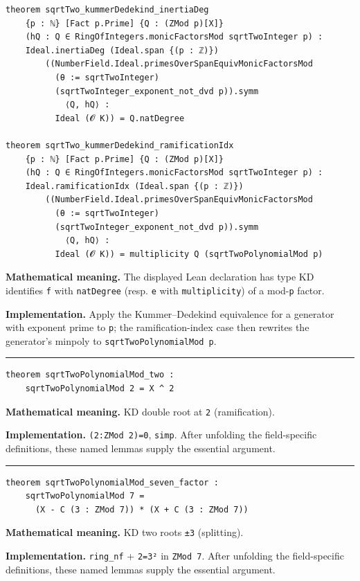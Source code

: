\documentclass[UTF8,a4paper,11pt,fontset=fandol]{ctexart}
\theoremstyle{definition}
\newcommand{\statementsep}{\par\medskip\hrule\medskip}
\begin{document}
\begin{verbatim}
theorem sqrtTwo_kummerDedekind_inertiaDeg
    {p : ℕ} [Fact p.Prime] {Q : (ZMod p)[X]}
    (hQ : Q ∈ RingOfIntegers.monicFactorsMod sqrtTwoInteger p) :
    Ideal.inertiaDeg (Ideal.span {(p : ℤ)})
        ((NumberField.Ideal.primesOverSpanEquivMonicFactorsMod
          (θ := sqrtTwoInteger)
          (sqrtTwoInteger_exponent_not_dvd p)).symm
            ⟨Q, hQ⟩ :
          Ideal (𝓞 K)) = Q.natDegree

theorem sqrtTwo_kummerDedekind_ramificationIdx
    {p : ℕ} [Fact p.Prime] {Q : (ZMod p)[X]}
    (hQ : Q ∈ RingOfIntegers.monicFactorsMod sqrtTwoInteger p) :
    Ideal.ramificationIdx (Ideal.span {(p : ℤ)})
        ((NumberField.Ideal.primesOverSpanEquivMonicFactorsMod
          (θ := sqrtTwoInteger)
          (sqrtTwoInteger_exponent_not_dvd p)).symm
            ⟨Q, hQ⟩ :
          Ideal (𝓞 K)) = multiplicity Q (sqrtTwoPolynomialMod p)
\end{verbatim}
\noindent\textbf{Mathematical meaning.} The displayed Lean declaration has type KD identifies \texttt{f} with \texttt{natDegree} (resp. \texttt{e} with \texttt{multiplicity}) of a mod-\texttt{p} factor.\par
\noindent\textbf{Implementation.} Apply the Kummer--Dedekind equivalence for a generator with exponent prime to \texttt{p}; the ramification-index case then rewrites the generator's minpoly to \texttt{sqrtTwoPolynomialMod p}.\par
\statementsep
\begin{verbatim}
theorem sqrtTwoPolynomialMod_two :
    sqrtTwoPolynomialMod 2 = X ^ 2
\end{verbatim}
\noindent\textbf{Mathematical meaning.} KD double root at \texttt{2} (ramification).\par
\noindent\textbf{Implementation.} \texttt{(2:ZMod 2)=0}, \texttt{simp}. After unfolding the field-specific definitions, these named lemmas supply the essential argument.\par
\statementsep
\begin{verbatim}
theorem sqrtTwoPolynomialMod_seven_factor :
    sqrtTwoPolynomialMod 7 =
      (X - C (3 : ZMod 7)) * (X + C (3 : ZMod 7))
\end{verbatim}
\noindent\textbf{Mathematical meaning.} KD two roots \texttt{±3} (splitting).\par
\noindent\textbf{Implementation.} \texttt{ring\_\allowbreak{}nf} + \texttt{2=3²} in \texttt{ZMod 7}. After unfolding the field-specific definitions, these named lemmas supply the essential argument.\par
\end{document}
